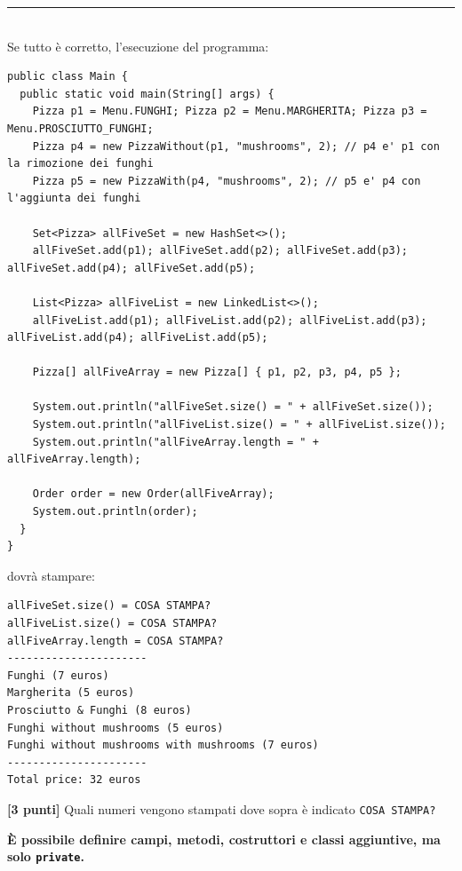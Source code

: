\documentclass{article}[10pt]
\newcounter{esnu}
\newenvironment{esercizio}{\medskip \noindent {\bf Esercizio\addtocounter{esnu}{1} \arabic{esnu}}}{}
\begin{document}
\vspace*{2ex}
\hrule

\mbox{}\\

Se tutto \`e corretto, l'esecuzione del programma:
{\scriptsize\begin{verbatim}
public class Main {
  public static void main(String[] args) {
    Pizza p1 = Menu.FUNGHI; Pizza p2 = Menu.MARGHERITA; Pizza p3 = Menu.PROSCIUTTO_FUNGHI;
    Pizza p4 = new PizzaWithout(p1, "mushrooms", 2); // p4 e' p1 con la rimozione dei funghi
    Pizza p5 = new PizzaWith(p4, "mushrooms", 2); // p5 e' p4 con l'aggiunta dei funghi

    Set<Pizza> allFiveSet = new HashSet<>();
    allFiveSet.add(p1); allFiveSet.add(p2); allFiveSet.add(p3); allFiveSet.add(p4); allFiveSet.add(p5);

    List<Pizza> allFiveList = new LinkedList<>();
    allFiveList.add(p1); allFiveList.add(p2); allFiveList.add(p3); allFiveList.add(p4); allFiveList.add(p5);

    Pizza[] allFiveArray = new Pizza[] { p1, p2, p3, p4, p5 };

    System.out.println("allFiveSet.size() = " + allFiveSet.size());
    System.out.println("allFiveList.size() = " + allFiveList.size());
    System.out.println("allFiveArray.length = " + allFiveArray.length);

    Order order = new Order(allFiveArray);
    System.out.println(order);
  }
}
\end{verbatim}}

\noindent dovr\`a stampare:

{\scriptsize\begin{verbatim}
allFiveSet.size() = COSA STAMPA?
allFiveList.size() = COSA STAMPA?
allFiveArray.length = COSA STAMPA?
----------------------
Funghi (7 euros)
Margherita (5 euros)
Prosciutto & Funghi (8 euros)
Funghi without mushrooms (5 euros)
Funghi without mushrooms with mushrooms (7 euros)
----------------------
Total price: 32 euros
\end{verbatim}}

\begin{esercizio}
\textbf{[3 punti]}
Quali numeri vengono stampati dove sopra \`e indicato \texttt{COSA STAMPA?}
\end{esercizio}

\begin{center}
\textbf{\`E possibile definire campi, metodi, costruttori e classi aggiuntive, ma solo \texttt{private}.}
\end{center}
\end{document}
